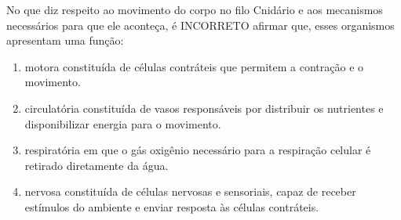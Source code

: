 \par

No que diz respeito ao movimento do corpo no filo Cnidário e aos mecanismos necessários para que ele aconteça, é INCORRETO afirmar que, esses organismos apresentam uma função:\begin{enumerate}
\item motora constituída de células contráteis que permitem a contração e o movimento.
\item circulatória constituída de vasos responsáveis por distribuir os nutrientes e disponibilizar energia para o
      movimento.
\item respiratória em que o gás oxigênio necessário para a respiração celular é retirado diretamente da água.
\item nervosa constituída de células nervosas e sensoriais, capaz de receber estímulos do ambiente e enviar
      resposta às células contráteis.
\end{enumerate}
